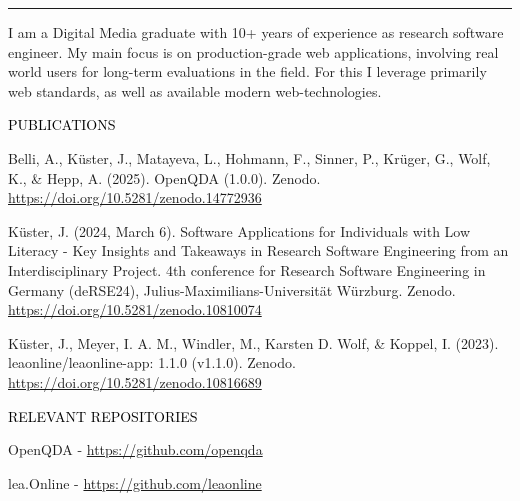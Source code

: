 \documentclass[10pt,A4]{article}
\newcommand{\link}[1]{\textcolor{bgcol}{\href{#1}{#1}}}
\newcommand{\cvsection}[1]
{
	\begin{flushleft}
		\LARGE\textcolor{black}{\uppercase{#1}}	\\[20pt]
	\end{flushleft}
}
\begin{document}
\normalsize

\textcolor{softcol}{\hrule}
\bigskip

I am a Digital Media graduate with 10+ years of experience as research software engineer.
My main focus is on production-grade web applications, involving real world users for
long-term evaluations in the field.
For this I leverage primarily web standards, as well as available modern web-technologies.

%
%

\cvsection{Publications}

\vbox{
Belli, A., Küster, J., Matayeva, L., Hohmann, F., Sinner, P., Krüger, G., Wolf, K., \& Hepp, A. (2025). OpenQDA (1.0.0). 
Zenodo.\\
\link{https://doi.org/10.5281/zenodo.14772936}\\
}

\vbox{
Küster, J. (2024, March 6). Software Applications for Individuals with Low Literacy - Key Insights and Takeaways in Research Software Engineering from an Interdisciplinary Project.
4th conference for Research Software Engineering in Germany (deRSE24), Julius-Maximilians-Universität Würzburg. Zenodo.\\
\link{https://doi.org/10.5281/zenodo.10810074}\\
}

\vbox{
Küster, J., Meyer, I. A. M., Windler, M., Karsten D. Wolf, \& Koppel, I. (2023). 
leaonline/leaonline-app: 1.1.0 (v1.1.0). Zenodo.\\
\link{https://doi.org/10.5281/zenodo.10816689}
}
\newpage
\cvsection{Relevant Repositories}

OpenQDA - \link{https://github.com/openqda}

lea.Online - \link{https://github.com/leaonline}
\end{document}
